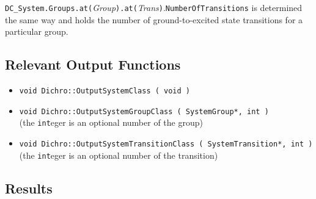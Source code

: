 \documentclass[11pt, letterpaper]{article}
\newcommand{\atGroup}{\texttt{at(}\emph{Group}\texttt{)}}
\newcommand{\atTrans}{\texttt{at(}\emph{Trans}\texttt{)}}
\begin{document}
\verb'DC_System.Groups.'\atGroup\verb'.'\atTrans.\verb'NumberOfTransitions' is determined the same way and holds the number of ground-to-excited state transitions for a particular group.


\subsection*{Relevant Output Functions}

\begin{itemize}
\item \verb'void Dichro::OutputSystemClass ( void )'
\item \verb'void Dichro::OutputSystemGroupClass ( SystemGroup*, int )' \\
      (the \verb'int'eger is an optional number of the group)
\item \verb'void Dichro::OutputSystemTransitionClass ( SystemTransition*, int )' \\
      (the \verb'int'eger is an optional number of the transition)
\end{itemize}




\newpage

\subsection{Results}
\label{Sec:DC_Results}
\end{document}

